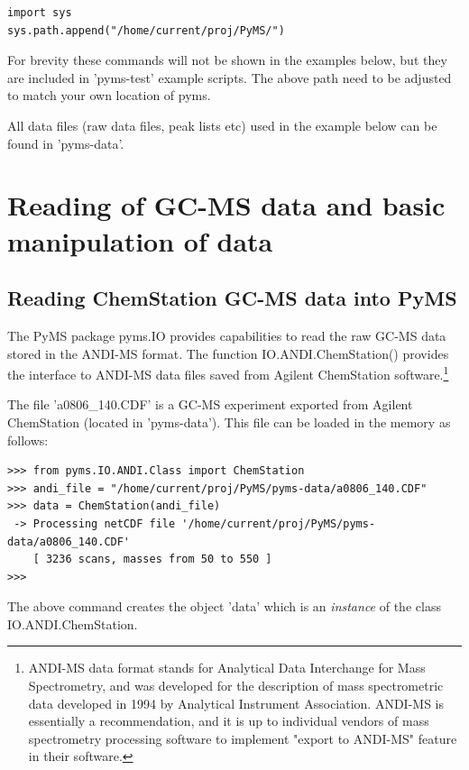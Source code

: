\begin{verbatim}
import sys
sys.path.append("/home/current/proj/PyMS/")
\end{verbatim}

For brevity these commands will not be shown in the examples below, but
they are included in 'pyms-test' example scripts.  The above path need
to be adjusted to match your own location of pyms.

All data files (raw data files, peak lists etc) used in the example below
can be found in 'pyms-data'.


\section{Reading of GC-MS data and basic manipulation of data}

\subsection{Reading ChemStation GC-MS data into PyMS}


The PyMS package pyms.IO provides capabilities to read the raw GC-MS
data stored in the ANDI-MS format. The function IO.ANDI.ChemStation()
provides the interface to ANDI-MS data files saved from Agilent
ChemStation software.\footnote{ANDI-MS data format stands for Analytical
Data Interchange for Mass Spectrometry, and was developed for the
description of mass spectrometric data developed in 1994 by Analytical
Instrument Association. ANDI-MS is essentially a recommendation, and
it is up to individual vendors of mass spectrometry processing software
to implement "export to ANDI-MS" feature in their software.}

The file 'a0806\_140.CDF' is a GC-MS experiment exported from Agilent
ChemStation (located in 'pyms-data'). This file can be loaded in the
memory as follows:

\begin{verbatim}
>>> from pyms.IO.ANDI.Class import ChemStation
>>> andi_file = "/home/current/proj/PyMS/pyms-data/a0806_140.CDF"
>>> data = ChemStation(andi_file)
 -> Processing netCDF file '/home/current/proj/PyMS/pyms-data/a0806_140.CDF'
    [ 3236 scans, masses from 50 to 550 ]
>>>
\end{verbatim}

\noindent
The above command creates the object 'data' which is an {\em instance}
of the class IO.ANDI.ChemStation.

